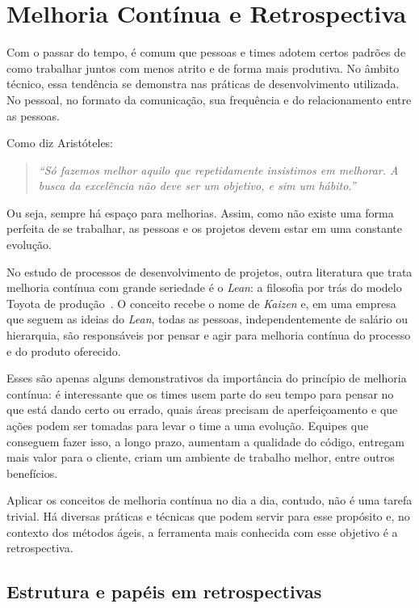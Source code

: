 \section{Melhoria Contínua e Retrospectiva}

Com o passar do tempo, é comum que pessoas e times adotem certos padrões de como trabalhar juntos com menos atrito e de forma mais produtiva. No âmbito técnico, essa tendência se demonstra nas práticas de desenvolvimento utilizada. No pessoal, no formato da comunicação, sua frequência e do relacionamento entre as pessoas.

Como diz Aristóteles: 

\begin{quote}
\textit{``Só fazemos melhor aquilo que repetidamente insistimos em melhorar. A busca da excelência não deve ser um objetivo, e sim um hábito.''}
\end{quote}

Ou seja, sempre há espaço para melhorias. Assim, como não existe uma forma perfeita de se trabalhar, as pessoas e os projetos devem estar em uma constante evolução.

No estudo de processos de desenvolvimento de projetos, outra literatura que trata melhoria contínua com grande seriedade é o \textit{Lean}: a filosofia por trás do modelo Toyota de produção~\cite{lean}. O conceito recebe o nome de \textit{Kaizen} e, em uma empresa que seguem as ideias do \textit{Lean}, todas as pessoas, independentemente de salário ou hierarquia, são responsáveis por pensar e agir para melhoria contínua do processo e do produto oferecido.

Esses são apenas alguns demonstrativos da importância do princípio de melhoria contínua: é interessante que os times usem parte do seu tempo para pensar no que está dando certo ou errado, quais áreas precisam de aperfeiçoamento e que ações podem ser tomadas para levar o time a uma evolução. Equipes que conseguem fazer isso, a longo prazo, aumentam a qualidade do código, entregam mais valor para o cliente, criam um ambiente de trabalho melhor, entre outros benefícios.

Aplicar os conceitos de melhoria contínua no dia a dia, contudo, não é uma tarefa trivial. Há diversas práticas e técnicas que podem servir para esse propósito e, no contexto dos métodos ágeis, a ferramenta mais conhecida com esse objetivo é a retrospectiva.

\subsection{Estrutura e papéis em retrospectivas}

